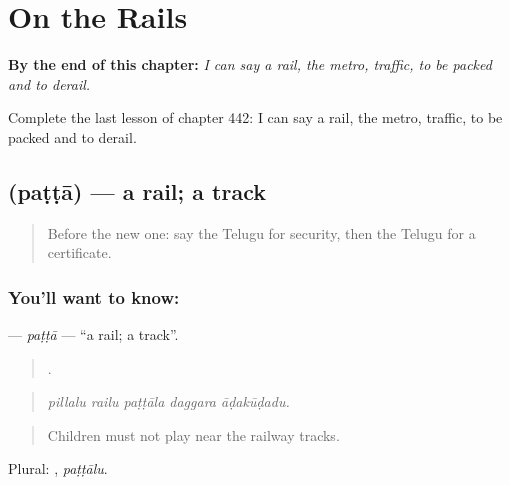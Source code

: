 
\chapter{On the Rails}
\label{ch:te-on-the-rails}

\begin{chapteropening}
\textbf{By the end of this chapter:} \emph{I can say a rail, the metro, traffic, to be packed and to derail.}

Complete the last lesson of chapter 442: I can say a rail, the metro, traffic, to be packed and to derail.
\end{chapteropening}

\section[\texorpdfstring{\te{పట్టా} (paṭṭā)}{పట్టా (paṭṭā)}]{ (paṭṭā) — a rail; a track}

\label{lesson:TE-C442-patta}



\begin{quote}
Before the new one: say the Telugu for security, then the Telugu for a certificate.
\end{quote}

\subsection*{You'll want to know: }
\textbf{} — \emph{paṭṭā} — \textquotedblleft{}a rail; a track\textquotedblright{}.

\begin{quote}
    .
\end{quote}

\begin{quote}
\emph{pillalu railu paṭṭāla daggara āḍakūḍadu.}
\end{quote}

\begin{quote}
Children must not play near the railway tracks.
\end{quote}

Plural: , \emph{paṭṭālu}.

